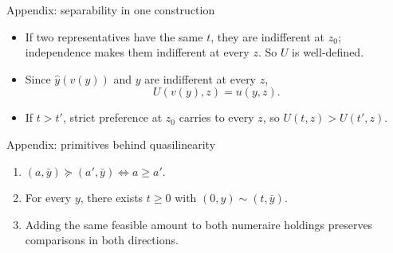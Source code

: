 \documentclass[handout,aspectratio=169,10pt]{beamer}
\begin{document}
\begin{frame}[label=proof-separability]{Appendix: separability in one construction}
\small
{}

\uncover<+->{\[
U(t,z)=u(\hat y(t),z).
\]}

\begin{itemize}
\item If two representatives have the same $t$, they are indifferent at $z_0$; independence makes them indifferent at every $z$. So $U$ is well-defined.
\item Since $\hat y(v(y))$ and $y$ are indifferent at every $z$,
\[
U(v(y),z)=u(y,z).
\]
\item If $t>t'$, strict preference at $z_0$ carries to every $z$, so $U(t,z)>U(t',z)$.
\end{itemize}

\vfill{}
\end{frame}

\begin{frame}[label=proof-quasilinearity]{Appendix: primitives behind quasilinearity}
\footnotesize
{}

\begin{enumerate}
\item $(a,\bar y)\succeq(a',\bar y)\iff a\ge a'$.
\item For every $y$, there exists $t\ge0$ with $(0,y)\sim(t,\bar y)$.
\item Adding the same feasible amount to both numeraire holdings preserves comparisons in both directions.
\end{enumerate}





\vfill{}

\end{frame}
\end{document}

